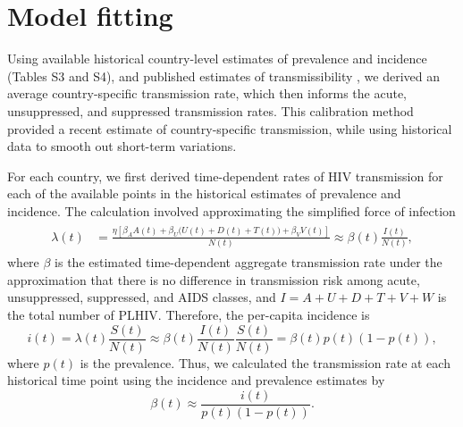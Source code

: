 \documentclass{article}
\begin{document}
\section{Model fitting}
\label{model_fitting}

Using available historical country-level estimates of prevalence and
incidence (Tables S3 and S4), and published estimates of
transmissibility
\cite{Wawer2005-us,Donnell2010-xo,Hughes2012-so,Skarbinski2015-ni}, we
derived an average country-specific transmission rate, which then
informs the acute, unsuppressed, and suppressed transmission rates.
This calibration method provided a recent estimate of country-specific
transmission, while using historical data to smooth out short-term
variations.

For each country, we first derived time-dependent rates of HIV
transmission for each of the available points in the historical
estimates of prevalence and incidence.  The calculation involved
approximating the simplified force of infection
\begin{align}
  \label{foi}
  \begin{split}
    \lambda(t) &= \frac{\eta \left[\beta_{A} A(t)
        + \beta_{U} \big(U(t) + D(t) + T(t)\big) +
        \beta_{V} V(t)\right]}{N(t)}
    \approx  \beta(t) \frac{I(t)}{N(t)},
  \end{split}
\end{align}
where $\beta$ is the estimated time-dependent aggregate transmission
rate under the approximation that there is no difference in
transmission risk among acute, unsuppressed, suppressed, and AIDS
classes, and $I = A + U + D + T + V + W$ is the total number of PLHIV.
Therefore, the per-capita incidence is
\begin{equation}
i(t) = \lambda(t) \frac{S(t)}{N(t)}
\approx \beta(t) \frac{I(t)}{N(t)} \frac{S(t)}{N(t)} =\beta(t) p(t) (1-p(t)),
\end{equation}
where $p(t)$ is the prevalence. Thus, we calculated the transmission
rate at each historical time point using the incidence and prevalence
estimates by
\begin{equation}
  \label{trans_rate}
  \beta(t) \approx \frac{i(t)}{p(t)(1-p(t))}.
\end{equation}
\end{document}
